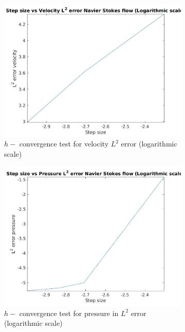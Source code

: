 \documentclass[a4paper]{book}
\begin{document}
\begin{figure}
\begin{subfigure}{\textwidth}	
  \includegraphics[width=\linewidth]{L2_convergence_velocity_n_s_log.jpg}
  \caption{$h-$ convergence test for velocity $L^2$ error (logarithmic scale)}
  \label{fig:vel_naviers_stoke_conv_log}
\end{subfigure}
\begin{subfigure}{\textwidth}	
  \includegraphics[width=\linewidth]{L2_convergence_pressure_n_s_log.jpg}
  \caption{$h-$ convergence test for pressure in $L^2$ error (logarithmic scale)}
  \label{fig:pre_navier_stoke_conv_log}
\end{subfigure}
\caption{\label{navier_stoke_conv_l2_log}}
\end{figure}
\end{document}
